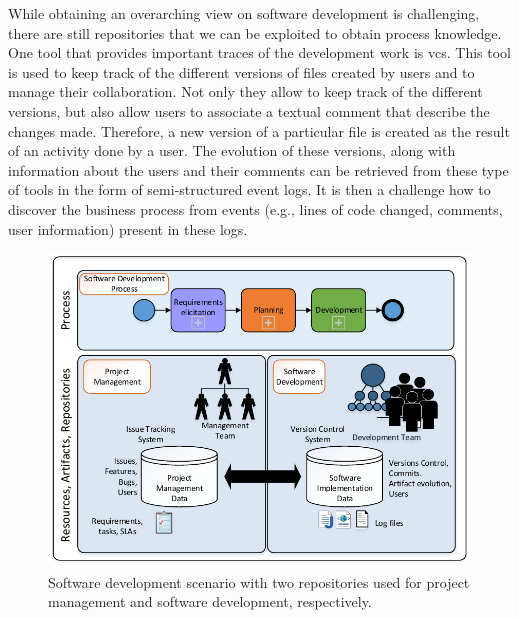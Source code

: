 \documentclass[a4paper,11pt]{article}
\begin{document}


While obtaining an overarching view on software development is challenging, there are still repositories that we can be exploited to obtain process knowledge. One tool that provides important traces of the development work is \gls{vcs}. This tool is used to keep track of the different versions of files created by users and to manage their collaboration. Not only they allow to keep track of the different versions, but also allow users to associate a textual comment that describe the changes made. Therefore, a new version of a particular file is created as the result of an activity done by a user. The evolution of these versions, along with information about the users and their comments can be retrieved from these type of tools in the form of semi-structured event logs. It is then a challenge how to discover the business process from events (e.g., lines of code changed, comments, user information) present in these logs.

%


\begin{figure}[h]
	\centering
	\includegraphics[width=0.7\linewidth]{figures/big-picture}
	\caption{Software development scenario with two repositories used for project management and software development, respectively.}
	\label{fig:big-picture}
\end{figure}
\end{document}
